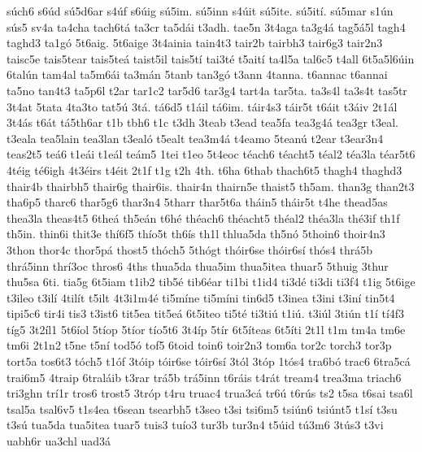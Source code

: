 {s^^fach6
s6^^fad
s^^fa5d6ar
s4^^faf
s6^^faig
s^^fa5im.
s^^fa5inn
s4^^fait
s^^fa5ite.
s^^fa5it^^ed.
s^^fa5mar
s1^^fan
s^^fas5
sv4a
ta4cha
tach6t^^e1
ta3cr
ta5d^^e1i
t3adh.
tae5n
3t4aga
ta3g4^^e1
tag5^^e15l
tagh4
taghd3
ta1g^^f3
5t6aig.
5t6aige
3t4ainia
tain4t3
tair2b
tairbh3
tair6g3
tair2n3
taisc5e
tais5tear
tais5te^^e1
taist5il
tais5t^^ed
tai3t^^e9
t5ait^^ed
ta4l5a
tal6c5
t4all
6t5a5l6^^fain
6tal^^fan
tam4al
ta5m6^^e1i
ta3m^^e1n
5tanb
tan3g^^f3
t3ann
4tanna.
t6annac
t6annai
ta5no
tan4t3
ta5p6l
t2ar
tar1c2
tar5d6
tar3g4
tart4a
tar5ta.
ta3s4l
ta3s4t
tas5tr
3t4at
5tata
4ta3to
tat5^^fa
3t^^e1.
t^^e16d5
t1^^e1il
t^^e16im.
t^^e1ir4s3
t^^e1ir5t
t6^^e1it
t3^^e1iv
2t1^^e1l
3t4^^e1s
t6^^e1t
t^^e15th6ar
t1b
tbh6
t1c
t3dh
3teab
t3ead
tea5fa
tea3g4^^e1
tea3gr
t3eal.
t3eala
tea5lain
tea3lan
t3eal^^f3
t5ealt
tea3m4^^e1
t4eamo
5tean^^fa
t2ear
t3ear3n4
teas2t5
te^^e16
t1e^^e1i
t1e^^e1l
te^^e1m5
1tei
t1eo
5t4eoc
t^^e9ach6
t^^e9acht5
t^^e9al2
t^^e9a3la
t^^e9ar5t6
4t^^e9ig
t^^e96igh
4t3^^e9irs
t4^^e9it
2t1f
t1g
t2h
4th.
t6ha
6thab
thach6t5
thagh4
thaghd3
thair4b
thairbh5
thair6g
thair6is.
thair4n
thairn5e
thaist5
th5am.
than3g
than2t3
tha6p5
tharc6
thar5g6
thar3n4
5tharr
thar5t6a
th^^e1in5
th^^e1ir5t
t4he
thead5as
thea3la
theas4t5
6the^^e1
th5e^^e1n
t6h^^e9
th^^e9ach6
th^^e9acht5
th^^e9al2
th^^e9a3la
th^^e93if
th1f
th5in.
thin6i
thit3e
th^^ed6f5
th^^edo5t
th6^^eds
th1l
thlua5da
th5n^^f3
5thoin6
thoir4n3
3thon
thor4c
thor5p^^e1
thost5
th^^f3ch5
5th^^f3gt
th^^f3ir6se
th^^f3ir6s^^ed
th^^f3s4
thr^^e15b
thr^^e15inn
thr^^ed3oc
thros6
4ths
thua5da
thua5im
thua5itea
thuar5
5thuig
3thur
thu5sa
6ti.
tia5g
6t5iam
t1ib2
tib5^^e9
tib6^^e9ar
ti1bi
t1id4
ti3d^^e9
ti3di
ti3f4
t1ig
5t6ige
t3ileo
t3il^^ed
4til^^edt
t5ilt
4t3i1m4^^e9
ti5m^^edne
ti5m^^edni
tin6d5
t3inea
t3ini
t3in^^ed
tin5t4
tipi5c6
tir4i
tis3
t3ist6
tit5ea
tit5e^^e1
6t5iteo
ti5t^^e9
ti3ti^^fa
t1i^^fa.
t3i^^fal
3ti^^fan
t1^^ed
t^^ed4f3
t^^edg5
3t2^^edl1
5t6^^edol
5t^^edop
5t^^edor
t^^edo5t6
3t4^^edp
5t^^edr
6t5^^edteas
6t5^^edti
2t1l
t1m
tm4a
tm6e
tm6i
2t1n2
t5ne
t5n^^ed
tod5^^f3
tof5
6toid
toin6
toir2n3
tom6a
tor2c
torch3
tor3p
tort5a
tos6t3
t^^f3ch5
t1^^f3f
3t^^f3ip
t^^f3ir6se
t^^f3ir6s^^ed
3t^^f3l
3t^^f3p
1t^^f3s4
tra6b^^f3
trac6
6tra5c^^e1
trai6m5
4traip
6tral^^e1ib
t3rar
tr^^e15b
tr^^e15inn
t6r^^e1is
t4r^^e1t
tream4
trea3ma
triach6
tri3ghn
tr^^ed1r
tros6
trost5
3tr^^f3p
t4ru
truac4
trua3c^^e1
tr6^^fa
t6r^^fas
ts2
t5sa
t6sai
tsa6l
tsal5a
tsal6v5
t1s4ea
t6sean
tsearbh5
t3seo
t3si
tsi6m5
tsi^^fan6
tsi^^fant5
t1s^^ed
t3su
t3s^^fa
tua5da
tua5itea
tuar5
tuis3
tu^^edo3
tur3b
tur3n4
t5^^faid
t^^fa3m6
3t^^fas3
t3vi
uabh6r
ua3chl
uad3^^e1
}
